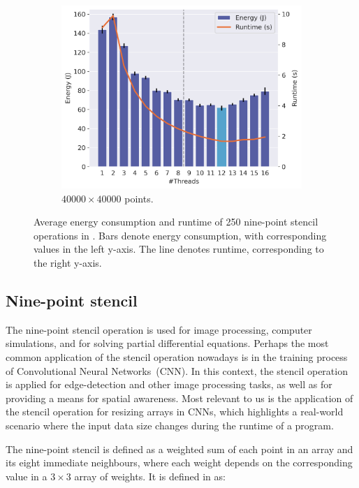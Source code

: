 \begin{figure}[!ht]
\begin{subfigure}{0.33\linewidth}
        \includegraphics[width=\linewidth]{images/stencil_40000.png}
        \caption{$40000 \times 40000$ points.}
        \label{fig:stencil3}
    \end{subfigure}%
    \caption{Average energy consumption and runtime of 250 nine-point stencil operations in \sac{}.
    Bars denote energy consumption, with corresponding values in the left y-axis.
    The line denotes runtime, corresponding to the right y-axis.}
    \label{fig:stencil}
\end{figure}

\subsection{Nine-point stencil}\label{sec:stencil}

The nine-point stencil operation is used for image processing, computer simulations, and for solving partial differential equations.
Perhaps the most common application of the stencil operation nowadays is in the training process of Convolutional Neural Networks~(CNN).
In this context, the stencil operation is applied for edge-detection and other image processing tasks, as well as for providing a means for spatial awareness.
Most relevant to us is the application of the stencil operation for resizing arrays in CNNs, which highlights a real-world scenario where the input data size changes during the runtime of a program.

The nine-point stencil is defined as a weighted sum of each point in an array and its eight immediate neighbours, where each weight depends on the corresponding value in a $3 \times 3$ array of weights.
It is defined in \sac{} as:

